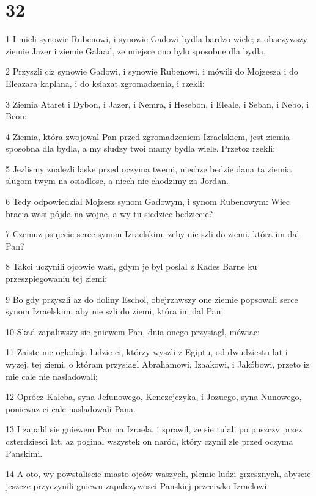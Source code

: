 \chapter{32}

\par 1 I mieli synowie Rubenowi, i synowie Gadowi bydla bardzo wiele; a obaczywszy ziemie Jazer i ziemie Galaad, ze miejsce ono bylo sposobne dla bydla,
\par 2 Przyszli ciz synowie Gadowi, i synowie Rubenowi, i mówili do Mojzesza i do Eleazara kaplana, i do ksiazat zgromadzenia, i rzekli:
\par 3 Ziemia Ataret i Dybon, i Jazer, i Nemra, i Hesebon, i Eleale, i Seban, i Nebo, i Beon:
\par 4 Ziemia, która zwojowal Pan przed zgromadzeniem Izraelskiem, jest ziemia sposobna dla bydla, a my sludzy twoi mamy bydla wiele. Przetoz rzekli:
\par 5 Jezlismy znalezli laske przed oczyma twemi, niechze bedzie dana ta ziemia slugom twym na osiadlosc, a niech nie chodzimy za Jordan.
\par 6 Tedy odpowiedzial Mojzesz synom Gadowym, i synom Rubenowym: Wiec bracia wasi pójda na wojne, a wy tu siedziec bedziecie?
\par 7 Czemuz psujecie serce synom Izraelskim, zeby nie szli do ziemi, która im dal Pan?
\par 8 Takci uczynili ojcowie wasi, gdym je byl poslal z Kades Barne ku przeszpiegowaniu tej ziemi;
\par 9 Bo gdy przyszli az do doliny Eschol, obejrzawszy one ziemie popsowali serce synom Izraelskim, aby nie szli do ziemi, która im dal Pan;
\par 10 Skad zapaliwszy sie gniewem Pan, dnia onego przysiagl, mówiac:
\par 11 Zaiste nie ogladaja ludzie ci, którzy wyszli z Egiptu, od dwudziestu lat i wyzej, tej ziemi, o któram przysiagl Abrahamowi, Izaakowi, i Jakóbowi, przeto iz mie cale nie nasladowali;
\par 12 Oprócz Kaleba, syna Jefunowego, Kenezejczyka, i Jozuego, syna Nunowego, poniewaz ci cale nasladowali Pana.
\par 13 I zapalil sie gniewem Pan na Izraela, i sprawil, ze sie tulali po puszczy przez czterdziesci lat, az poginal wszystek on naród, który czynil zle przed oczyma Panskimi.
\par 14 A oto, wy powstaliscie miasto ojców waszych, plemie ludzi grzesznych, abyscie jeszcze przyczynili gniewu zapalczywosci Panskiej przeciwko Izraelowi.
